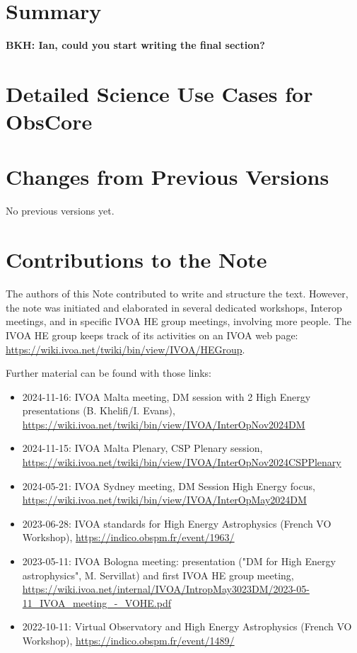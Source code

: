 \documentclass[11pt,a4paper]{ivoa}
\begin{document}
\section{Summary}\label{sec:summary}

{\bf BKH: Ian, could you start writing the final section?}

\pagebreak
\printglossaries



\appendix


\section{Detailed Science Use Cases for ObsCore}
\label{sec:uc}




\section{Changes from Previous Versions}

No previous versions yet.


\section{Contributions to the Note}

The authors of this Note contributed to write and structure the text. However, the note was initiated and elaborated in several dedicated workshops, Interop meetings,  and in specific \gls{IVOA} \gls{HE} group meetings, involving more people. The \gls{IVOA} \gls{HE} group keeps track of its activities on an \gls{IVOA} web page: \url{https://wiki.ivoa.net/twiki/bin/view/IVOA/HEGroup}.

Further material can be found with those links:
\begin{itemize}
    \item 2024-11-16: IVOA Malta meeting, DM session with 2 High Energy presentations (B. Khelifi/I. Evans), \url{https://wiki.ivoa.net/twiki/bin/view/IVOA/InterOpNov2024DM}
    \item 2024-11-15: IVOA Malta Plenary, CSP Plenary session, \url{https://wiki.ivoa.net/twiki/bin/view/IVOA/InterOpNov2024CSPPlenary}
    \item 2024-05-21: IVOA Sydney meeting, DM Session High Energy focus, \url{https://wiki.ivoa.net/twiki/bin/view/IVOA/InterOpMay2024DM}
    \item 2023-06-28: IVOA standards for High Energy Astrophysics (French VO Workshop), \url{https://indico.obspm.fr/event/1963/}
    \item 2023-05-11: IVOA Bologna meeting: presentation ("DM for High Energy astrophysics", M. Servillat) and first IVOA HE group meeting, \url{https://wiki.ivoa.net/internal/IVOA/IntropMay3023DM/2023-05-11_IVOA_meeting_-_VOHE.pdf}
    \item 2022-10-11: Virtual Observatory and High Energy Astrophysics (French VO Workshop), \url{https://indico.obspm.fr/event/1489/}
\end{itemize}

\end{document}
